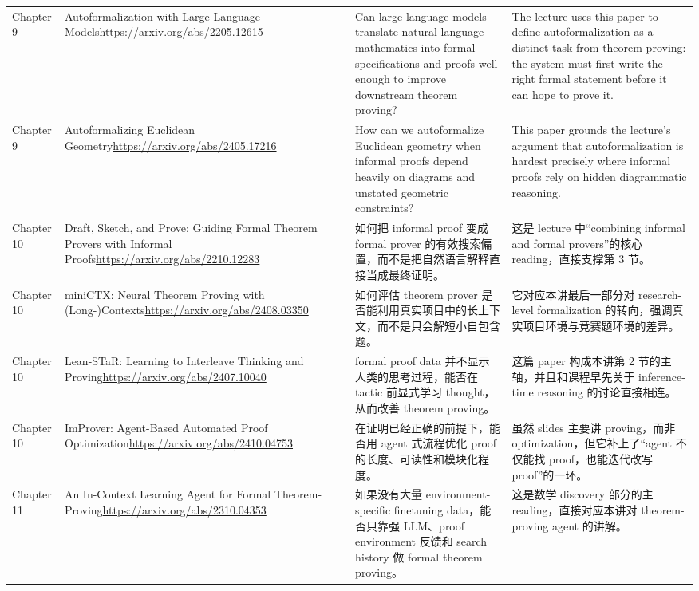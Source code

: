 \begin{longtable}{p{}p{}p{}p{}}
Chapter 9 & Autoformalization with Large Language Models\newline\url{https://arxiv.org/abs/2205.12615} & Can large language models translate natural-language mathematics into formal specifications and proofs well enough to improve downstream theorem proving? & The lecture uses this paper to define autoformalization as a distinct task from theorem proving: the system must first write the right formal statement before it can hope to prove it. \\
Chapter 9 & Autoformalizing Euclidean Geometry\newline\url{https://arxiv.org/abs/2405.17216} & How can we autoformalize Euclidean geometry when informal proofs depend heavily on diagrams and unstated geometric constraints? & This paper grounds the lecture's argument that autoformalization is hardest precisely where informal proofs rely on hidden diagrammatic reasoning. \\
Chapter 10 & Draft, Sketch, and Prove: Guiding Formal Theorem Provers with Informal Proofs\newline\url{https://arxiv.org/abs/2210.12283} & 如何把 informal proof 变成 formal prover 的有效搜索偏置，而不是把自然语言解释直接当成最终证明。 & 这是 lecture 中“combining informal and formal provers”的核心 reading，直接支撑第 3 节。 \\
Chapter 10 & miniCTX: Neural Theorem Proving with (Long-)Contexts\newline\url{https://arxiv.org/abs/2408.03350} & 如何评估 theorem prover 是否能利用真实项目中的长上下文，而不是只会解短小自包含题。 & 它对应本讲最后一部分对 research-level formalization 的转向，强调真实项目环境与竞赛题环境的差异。 \\
Chapter 10 & Lean-STaR: Learning to Interleave Thinking and Proving\newline\url{https://arxiv.org/abs/2407.10040} & formal proof data 并不显示人类的思考过程，能否在 tactic 前显式学习 thought，从而改善 theorem proving。 & 这篇 paper 构成本讲第 2 节的主轴，并且和课程早先关于 inference-time reasoning 的讨论直接相连。 \\
Chapter 10 & ImProver: Agent-Based Automated Proof Optimization\newline\url{https://arxiv.org/abs/2410.04753} & 在证明已经正确的前提下，能否用 agent 式流程优化 proof 的长度、可读性和模块化程度。 & 虽然 slides 主要讲 proving，而非 optimization，但它补上了“agent 不仅能找 proof，也能迭代改写 proof”的一环。 \\
Chapter 11 & An In-Context Learning Agent for Formal Theorem-Proving\newline\url{https://arxiv.org/abs/2310.04353} & 如果没有大量 environment-specific finetuning data，能否只靠强 LLM、proof environment 反馈和 search history 做 formal theorem proving。 & 这是数学 discovery 部分的主 reading，直接对应本讲对 theorem-proving agent 的讲解。 \\

\end{longtable}
